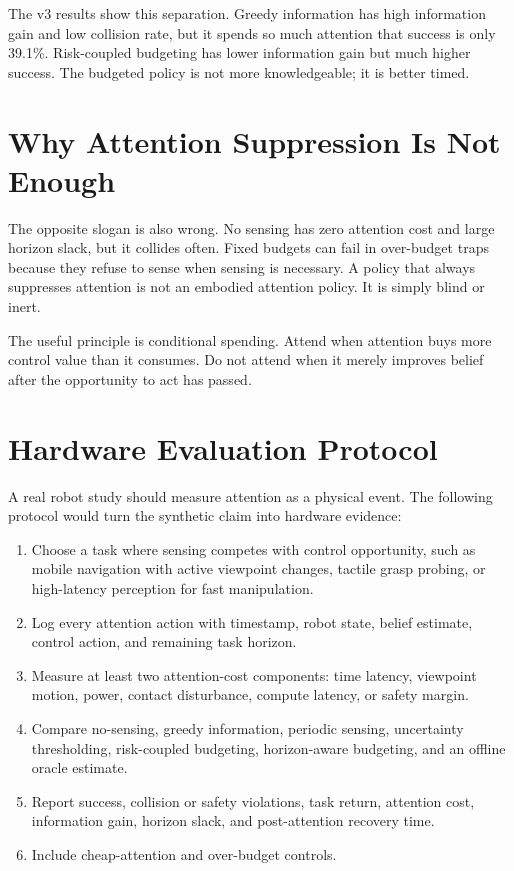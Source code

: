 \documentclass{article}
\begin{document}
The v3 results show this separation. Greedy information has high information
gain and low collision rate, but it spends so much attention that success is
only 39.1\%. Risk-coupled budgeting has lower information gain but much higher
success. The budgeted policy is not more knowledgeable; it is better timed.

\section{Why Attention Suppression Is Not Enough}

The opposite slogan is also wrong. No sensing has zero attention cost and large
horizon slack, but it collides often. Fixed budgets can fail in over-budget
traps because they refuse to sense when sensing is necessary. A policy that
always suppresses attention is not an embodied attention policy. It is simply
blind or inert.

The useful principle is conditional spending. Attend when attention buys more
control value than it consumes. Do not attend when it merely improves belief
after the opportunity to act has passed.

\section{Hardware Evaluation Protocol}

A real robot study should measure attention as a physical event. The following
protocol would turn the synthetic claim into hardware evidence:

\begin{enumerate}
    \item Choose a task where sensing competes with control opportunity, such
    as mobile navigation with active viewpoint changes, tactile grasp probing,
    or high-latency perception for fast manipulation.
    \item Log every attention action with timestamp, robot state, belief
    estimate, control action, and remaining task horizon.
    \item Measure at least two attention-cost components: time latency,
    viewpoint motion, power, contact disturbance, compute latency, or safety
    margin.
    \item Compare no-sensing, greedy information, periodic sensing,
    uncertainty thresholding, risk-coupled budgeting, horizon-aware budgeting,
    and an offline oracle estimate.
    \item Report success, collision or safety violations, task return,
    attention cost, information gain, horizon slack, and post-attention
    recovery time.
    \item Include cheap-attention and over-budget controls.
\end{enumerate}
\end{document}
